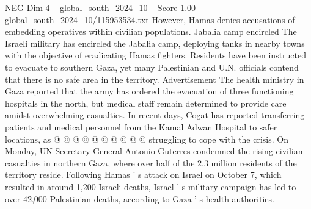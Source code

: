 \begin{textsample}{NEG Dim 4 – global\_south\_2024\_10 – Score 1.00 – global\_south\_2024\_10/115953534.txt}
However, Hamas denies accusations of embedding operatives within civilian populations.
Jabalia camp encircled The Israeli military has encircled the Jabalia camp, deploying tanks in nearby towns with the objective of eradicating Hamas fighters.
Residents have been instructed to evacuate to southern Gaza, yet many Palestinian and U.N. officials contend that there is no safe area in the territory.
Advertisement The health ministry in Gaza reported that the army has ordered the evacuation of three functioning hospitals in the north, but medical staff remain determined to provide care amidst overwhelming casualties.
In recent days, Cogat has reported transferring patients and medical personnel from the Kamal Adwan Hospital to safer locations, as @ @ @ @ @ @ @ @ @ @ struggling to cope with the crisis.
On Monday, UN Secretary-General Antonio Guterres condemned the rising civilian casualties in northern Gaza, where over half of the 2.3 million residents of the territory reside.
Following Hamas ' s attack on Israel on October 7, which resulted in around 1,200 Israeli deaths, Israel ' s military campaign has led to over 42,000 Palestinian deaths, according to Gaza ' s health authorities.

\end{textsample}
